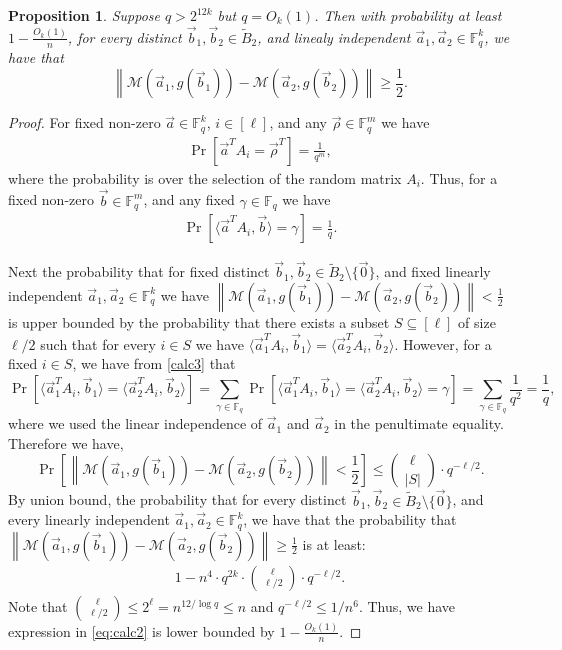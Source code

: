\documentclass[10pt,a4paper]{article}
\newcommand{\F}{\mathbb{F}}
\renewcommand{\ge}{ \geqslant}
\renewcommand{\le}{ \leqslant}
\newtheorem{proposition}[theorem]{Proposition}
\renewcommand{\tilde}{\widetilde}
\newcommand{\M}{\mathcal{M}}
\begin{document}
  
  \begin{proposition}\label{prop:collisionalphabeta}
Suppose $q>2^{12k}$ but $q=O_k(1)$. Then with probability at least $1-\frac{O_k(1)}{n}$,   for every  distinct $\vec{b}_1,\vec{b}_2\in \tilde{B}_2$, and  linealy independent $\vec{a}_1,\vec{a}_2\in\F_q^k$, we  have that  $$\left\|\M\left(\vec{a}_1,g(\vec{b}_1)\right)- \M\left(\vec{a}_2,g(\vec{b}_2)\right)\right\|\ge \frac{1}{2}.$$  
\end{proposition}  
\begin{proof}
For fixed non-zero $\vec{a}\in\F_q^k$, $i\in[\ell]$, and any $\vec{\rho}\in \F_q^m$ we have 
\begin{align}
\Pr\left[\vec{a}^T A_i=\vec{\rho}^T\right]=\frac{1}{q^m},\nonumber
\end{align}
where the probability is over the selection of the random matrix  $A_i$. Thus, for a fixed non-zero $\vec{b}\in \F_q^m$, and   any fixed $\gamma\in \F_q$ we have 
\begin{align}
\Pr\left[\langle\vec{a}^T A_i,\vec{b}\rangle=\gamma\right]=\frac{1}{q}.\label{calc3}
\end{align}

Next the probability that for fixed distinct $\vec{b}_1,\vec{b}_2\in \tilde{B}_2\setminus\{\vec{0}\}$, and fixed linearly independent $\vec{a}_1,\vec{a}_2\in\F_q^k$ we have $\left\|\M\left(\vec{a}_1,g(\vec{b}_1)\right)-\M\left(\vec{a}_2,g(\vec{b}_2)\right)\right\|< \frac{1}{2}$ is upper bounded by the probability that there exists a subset  $S\subseteq [\ell]$ of size    $\ell /2$ such  that for every $i\in S$ we have $\langle \vec{a}_1^T A_i, \vec{b}_1\rangle= \langle \vec{a}_2^T A_i, \vec{b}_2\rangle$. However, for a fixed $i\in S$, we have from \eqref{calc3} that  
$$
\Pr\left[\langle \vec{a}_1^T A_i, \vec{b}_1\rangle= \langle \vec{a}_2^T A_i, \vec{b}_2\rangle\right]=\sum_{\gamma\in\F_q}\Pr\left[\langle \vec{a}_1^T A_i, \vec{b}_1\rangle= \langle \vec{a}_2^T A_i, \vec{b}_2\rangle=\gamma\right]=\sum_{\gamma\in \F_q}\frac{1}{q^2}=\frac{1}{q},
$$
where we used the linear independence of $\vec{a}_1$ and $\vec{a}_2$ in the penultimate equality. 
Therefore we have, 
$$\Pr\left[\left\|\M\left(\vec{a}_1,g(\vec{b}_1)\right)- \M\left(\vec{a}_2,g(\vec{b}_2)\right)\right\|< \frac{1}{2}\right]\le \binom{\ell }{|S|}\cdot q^{-\ell/2}.$$
By union bound, the probability that for every    distinct $\vec{b}_1,\vec{b}_2\in \tilde{B}_2\setminus\{\vec{0}\}$, and every linearly independent $\vec{a}_1,\vec{a}_2\in\F_q^k$, we  have that the probability that $\left\|\M\left(\vec{a}_1,g(\vec{b}_1)\right)- \M\left(\vec{a}_2,g(\vec{b}_2)\right)\right\|\ge \frac{1}{2}$  is at least:
\begin{align}
   1-n^4\cdot q^{2k}\cdot\binom{\ell }{\ell /2}\cdot q^{-\ell/2}.\label{eq:calc2}
\end{align}
Note that $\binom{\ell }{\ell /2}\le 2^{\ell}=n^{12/\log q}\le n$ and $q^{-\ell /2}\le  1/n^{6}$. Thus, we have expression in \eqref{eq:calc2} is lower bounded by $1-\frac{O_k(1)}{n}$. 


\end{proof}
\end{document}
